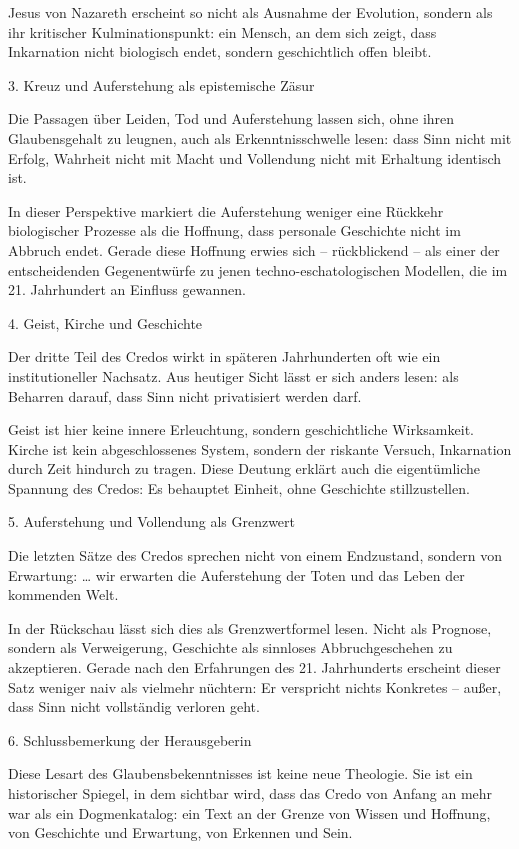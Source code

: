 \documentclass[
  ngerman,
]{article}
\begin{document}
Jesus von Nazareth erscheint so nicht als Ausnahme der Evolution,
sondern als ihr kritischer Kulminationspunkt: ein Mensch, an dem sich
zeigt, dass Inkarnation nicht biologisch endet, sondern geschichtlich
offen bleibt.

3. Kreuz und Auferstehung als epistemische Zäsur

Die Passagen über Leiden, Tod und Auferstehung lassen sich, ohne ihren
Glaubensgehalt zu leugnen, auch als Erkenntnisschwelle lesen: dass Sinn
nicht mit Erfolg, Wahrheit nicht mit Macht und Vollendung nicht mit
Erhaltung identisch ist.

In dieser Perspektive markiert die Auferstehung weniger eine Rückkehr
biologischer Prozesse als die Hoffnung, dass personale Geschichte nicht
im Abbruch endet. Gerade diese Hoffnung erwies sich -- rückblickend --
als einer der entscheidenden Gegenentwürfe zu jenen
techno-eschatologischen Modellen, die im 21. Jahrhundert an Einfluss
gewannen.

4. Geist, Kirche und Geschichte

Der dritte Teil des Credos wirkt in späteren Jahrhunderten oft wie ein
institutioneller Nachsatz. Aus heutiger Sicht lässt er sich anders
lesen: als Beharren darauf, dass Sinn nicht privatisiert werden darf.

Geist ist hier keine innere Erleuchtung, sondern geschichtliche
Wirksamkeit. Kirche ist kein abgeschlossenes System, sondern der
riskante Versuch, Inkarnation durch Zeit hindurch zu tragen. Diese
Deutung erklärt auch die eigentümliche Spannung des Credos: Es behauptet
Einheit, ohne Geschichte stillzustellen.

5. Auferstehung und Vollendung als Grenzwert

Die letzten Sätze des Credos sprechen nicht von einem Endzustand,
sondern von Erwartung: \ldots{} wir erwarten die Auferstehung der Toten
und das Leben der kommenden Welt.

In der Rückschau lässt sich dies als Grenzwertformel lesen. Nicht als
Prognose, sondern als Verweigerung, Geschichte als sinnloses
Abbruchgeschehen zu akzeptieren. Gerade nach den Erfahrungen des 21.
Jahrhunderts erscheint dieser Satz weniger naiv als vielmehr nüchtern:
Er verspricht nichts Konkretes -- außer, dass Sinn nicht vollständig
verloren geht.

6. Schlussbemerkung der Herausgeberin

Diese Lesart des Glaubensbekenntnisses ist keine neue Theologie. Sie ist
ein historischer Spiegel, in dem sichtbar wird, dass das Credo von
Anfang an mehr war als ein Dogmenkatalog: ein Text an der Grenze von
Wissen und Hoffnung, von Geschichte und Erwartung, von Erkennen und
Sein.
\end{document}
